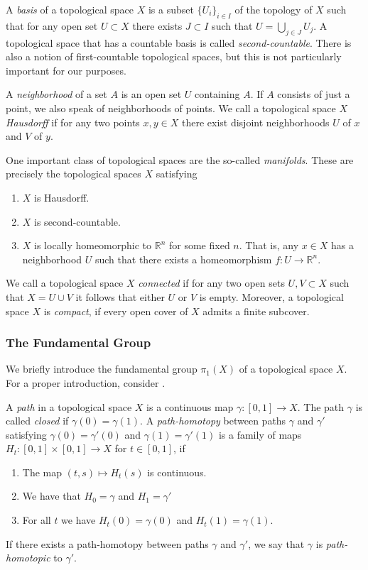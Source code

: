 \documentclass[a4paper]{article}
\theoremstyle{definition}
\begin{document}
A \textit{basis} of a topological space $X$ is a subset $\{U_i\}_{i \in I}$ of the topology of $X$ such that for any open set $U \subset X$ there exists $J \subset I$ such that $U = \bigcup_{j \in J} U_j$. A topological space that has a countable basis is called \textit{second-countable}. There is also a notion of first-countable topological spaces, but this is not particularly important for our purposes.

A \textit{neighborhood} of a set $A$ is an open set $U$ containing $A$. If $A$ consists of just a point, we also speak of neighborhoods of points.
We call a topological space $X$ \textit{Hausdorff} if for any two points $x, y \in X$ there exist disjoint neighborhoods $U$ of $x$ and $V$ of $y$.

One important class of topological spaces are the so-called \textit{manifolds}. These are precisely the topological spaces $X$ satisfying
\begin{enumerate}
\item $X$ is Hausdorff.
\item $X$ is second-countable.
\item $X$ is locally homeomorphic to $\mathbb{R}^n$ for some fixed $n$. That is, any $x \in X$ has a neighborhood $U$ such that there exists a homeomorphism $f: U \rightarrow \mathbb{R}^n$.
\end{enumerate}

We call a topological space $X$ \textit{connected} if for any two open sets $U, V \subset X$ such that $X = U \cup V$ it follows that either $U$ or $V$ is empty. Moreover, a topological space $X$ is \textit{compact}, if every open cover of $X$ admits a finite subcover.

\subsubsection{The Fundamental Group}
We briefly introduce the fundamental group $\pi_1(X)$ of a topological space $X$. For a proper introduction, consider \cite{hatcher2002}.

A \textit{path} in a topological space $X$ is a continuous map $\gamma: [0, 1] \rightarrow X$. The path $\gamma$ is called \textit{closed} if $\gamma(0) = \gamma(1)$. A \textit{path-homotopy} between paths $\gamma$ and $\gamma'$ satisfying $\gamma(0) = \gamma'(0)$ and $\gamma(1) = \gamma'(1)$ is a family of maps $H_t: [0, 1] \times [0, 1] \rightarrow X$ for $t \in [0,1]$, if
\begin{enumerate}
\item The map $(t, s) \mapsto H_t(s)$ is continuous.
\item We have that $H_0 = \gamma$ and $H_1 = \gamma'$
\item For all $t$ we have $H_t(0) = \gamma(0)$ and $H_t(1) = \gamma(1)$.
\end{enumerate}
If there exists a path-homotopy between paths $\gamma$ and $\gamma'$, we say that $\gamma$ is \textit{path-homotopic} to $\gamma'$.
\end{document}
